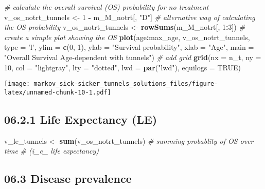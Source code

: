 \documentclass[
]{article}
\newenvironment{Shaded}{\begin{snugshade}}{\end{snugshade}}
\newcommand{\CommentTok}[1]{\textcolor[rgb]{0.56,0.35,0.01}{\textit{#1}}}
\newcommand{\DataTypeTok}[1]{\textcolor[rgb]{0.13,0.29,0.53}{#1}}
\newcommand{\DecValTok}[1]{\textcolor[rgb]{0.00,0.00,0.81}{#1}}
\newcommand{\KeywordTok}[1]{\textcolor[rgb]{0.13,0.29,0.53}{\textbf{#1}}}
\newcommand{\NormalTok}[1]{#1}
\newcommand{\OperatorTok}[1]{\textcolor[rgb]{0.81,0.36,0.00}{\textbf{#1}}}
\newcommand{\OtherTok}[1]{\textcolor[rgb]{0.56,0.35,0.01}{#1}}
\newcommand{\StringTok}[1]{\textcolor[rgb]{0.31,0.60,0.02}{#1}}
\begin{document}
\begin{Shaded}
\begin{Highlighting}[]
\CommentTok{# calculate the overall survival (OS) probability for no treatment}
\NormalTok{v_os_notrt_tunnels <-}\StringTok{ }\DecValTok{1} \OperatorTok{-}\StringTok{ }\NormalTok{m_M_notrt[, }\StringTok{"D"}\NormalTok{]       }
\CommentTok{# alternative way of calculating the OS probability }
\NormalTok{v_os_notrt_tunnels <-}\StringTok{ }\KeywordTok{rowSums}\NormalTok{(m_M_notrt[, }\DecValTok{1}\OperatorTok{:}\DecValTok{3}\NormalTok{])    }
\CommentTok{# create a simple plot showing the OS}
\KeywordTok{plot}\NormalTok{(age}\OperatorTok{:}\NormalTok{max_age, v_os_notrt_tunnels, }\DataTypeTok{type =} \StringTok{'l'}\NormalTok{, }
     \DataTypeTok{ylim =} \KeywordTok{c}\NormalTok{(}\DecValTok{0}\NormalTok{, }\DecValTok{1}\NormalTok{),}
     \DataTypeTok{ylab =} \StringTok{"Survival probability"}\NormalTok{,}
     \DataTypeTok{xlab =} \StringTok{"Age"}\NormalTok{,}
     \DataTypeTok{main =} \StringTok{"Overall Survival Age-dependent with tunnels"}\NormalTok{)  }
\CommentTok{# add grid }
\KeywordTok{grid}\NormalTok{(}\DataTypeTok{nx =}\NormalTok{ n_t, }\DataTypeTok{ny =} \DecValTok{10}\NormalTok{, }\DataTypeTok{col =} \StringTok{"lightgray"}\NormalTok{, }\DataTypeTok{lty =} \StringTok{"dotted"}\NormalTok{, }\DataTypeTok{lwd =} \KeywordTok{par}\NormalTok{(}\StringTok{"lwd"}\NormalTok{), }
     \DataTypeTok{equilogs =} \OtherTok{TRUE}\NormalTok{) }
\end{Highlighting}
\end{Shaded}

\texttt{[image: markov\_sick-sicker\_tunnels\_solutions\_files/figure-latex/unnamed-chunk-10-1.pdf]}

\hypertarget{life-expectancy-le}{%
\subsection{06.2.1 Life Expectancy (LE)}\label{life-expectancy-le}}

\begin{Shaded}
\begin{Highlighting}[]
\NormalTok{v_le_tunnels <-}\StringTok{ }\KeywordTok{sum}\NormalTok{(v_os_notrt_tunnels)  }\CommentTok{# summing probablity of OS over time }
                                         \CommentTok{# (i_e_ life expectancy)}
\end{Highlighting}
\end{Shaded}

\hypertarget{disease-prevalence}{%
\subsection{06.3 Disease prevalence}\label{disease-prevalence}}
\end{document}
